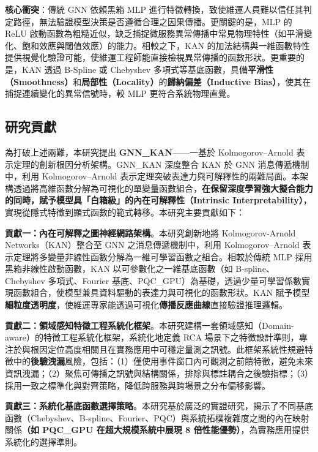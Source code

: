 \documentclass[10pt,a4paper,twocolumn]{article}
\begin{document}
\textbf{核心衝突}：傳統 GNN 依賴黑箱 MLP 進行特徵轉換，致使維運人員難以信任其判定路徑，無法驗證模型決策是否遵循合理之因果傳播。更關鍵的是，MLP 的 ReLU 啟動函數為粗糙近似，缺乏捕捉微服務異常傳播中常見物理特性（如平滑變化、飽和效應與閾值效應）的能力。相較之下，KAN 的加法結構與一維函數特性提供視覺化驗證可能，使維運工程師能直接檢視異常傳播的函數形狀。更重要的是，KAN 透過 B-Spline 或 Chebyshev 多項式等基底函數，具備\textbf{平滑性（Smoothness）}和\textbf{局部性（Locality）}的\textbf{歸納偏差（Inductive Bias）}，使其在捕捉連續變化的異常信號時，較 MLP 更符合系統物理直覺。

\subsection{研究貢獻}

為打破上述兩難，本研究提出 \textbf{GNN\_KAN}——一基於 Kolmogorov–Arnold 表示定理的創新根因分析架構。GNN\_KAN 深度整合 KAN 於 GNN 消息傳遞機制中，利用 Kolmogorov–Arnold 表示定理突破表達力與可解釋性的兩難局面。本架構透過將高維函數分解為可視化的單變量函數組合，\textbf{在保留深度學習強大擬合能力的同時，賦予模型具「白箱級」的內在可解釋性（Intrinsic Interpretability）}，實現從隱式特徵到顯式函數的範式轉移。本研究主要貢獻如下：

\textbf{貢獻一：內在可解釋之圖神經網路架構}。本研究創新地將 Kolmogorov-Arnold Networks（KAN）整合至 GNN 之消息傳遞機制中，利用 Kolmogorov–Arnold 表示定理將多變量非線性函數分解為一維可學習函數之組合。相較於傳統 MLP 採用黑箱非線性啟動函數，KAN 以可參數化之一維基底函數（如 B-spline、Chebyshev 多項式、Fourier 基底、PQC\_GPU）為基礎，透過少量可學習係數實現函數組合，使模型兼具資料驅動的表達力與可視化的函數形狀。KAN 賦予模型\textbf{細粒度透明度}，使維運專家能透過可視化\textbf{傳播反應曲線}直接驗證推理邏輯。

\textbf{貢獻二：領域感知特徵工程系統化框架}。本研究建構一套領域感知（Domain-aware）的特徵工程系統化框架，系統化地定義 RCA 場景下之特徵設計準則，專注於與根因定位高度相關且在實務應用中可穩定量測之訊號。此框架系統性規避特徵中的\textbf{後驗洩漏}風險，包括：（1）僅使用事件窗口內可觀測之前饋特徵，避免未來資訊洩漏；（2）聚焦可傳播之訊號與結構關係，排除與標註耦合之後驗指標；（3）採用一致之標準化與對齊策略，降低跨服務與跨場景之分布偏移影響。

\textbf{貢獻三：系統化基底函數選擇策略}。本研究基於廣泛的實證研究，揭示了不同基底函數（Chebyshev、B-spline、Fourier、PQC）與系統拓樸複雜度之間的內在映射關係\textbf{（如 PQC\_GPU 在超大規模系統中展現 8 倍性能優勢）}，為實務應用提供系統化的選擇準則。
\end{document}
